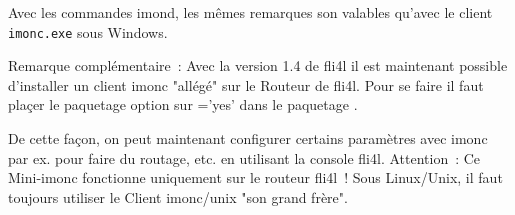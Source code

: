   \noindent Avec les commandes imond, les mêmes remarques son valables
  qu'avec le client \verb+imonc.exe+ sous Windows.

  Remarque complémentaire~: Avec la version 1.4 de fli4l il est maintenant
  possible d'installer un client imonc "allégé" sur le Routeur de fli4l.
  Pour se faire il faut plaçer le paquetage option sur
  ='yes' dans le paquetage
  .

  De cette façon, on peut maintenant configurer certains paramètres avec imonc
  par ex. pour faire du routage, etc. en utilisant la console fli4l. Attention~:
  Ce Mini-imonc fonctionne uniquement sur le routeur fli4l~! Sous Linux/Unix,
  il faut toujours utiliser le Client imonc/unix "son grand frère".

